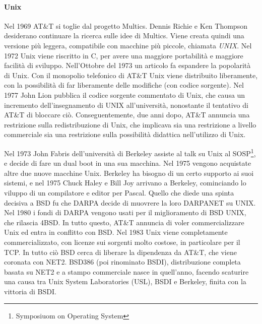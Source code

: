 \paragraph*{Unix} Nel 1969 AT\&T si toglie dal progetto Multics. Dennis Richie e Ken Thompson desiderano continuare la ricerca sulle idee di Multics. Viene creata quindi una versione pi\`u leggera, compatibile con macchine pi\`u piccole, chiamata \textit{UNIX}. Nel 1972 Unix viene riscritto in C, per avere una maggiore portabilit\`a e maggiore facilit\`a di sviluppo. Nell'Ottobre del 1973 un articolo fa espandere la popolarit\`a di Unix.
Con il monopolio telefonico di AT\&T Unix viene distribuito liberamente, con la possibilit\`a di far liberamente delle modifiche (con codice sorgente). Nel 1977 John Lion pubblica il codice sorgente commentato di Unix, che causa un incremento dell'insegnamento di UNIX all'universit\`a, nonostante il tentativo di AT\&T di bloccare ci\`o. Conseguentemente, due anni dopo, AT\&T annuncia una restrizione sulla redistribuzione di Unix, che implicava sia una restrizione a livello commerciale sia una restrizione sulla possibilit\`a didattica nell'utilizzo di Unix.

Nel 1973 John Fabris dell'universit\`a di Berkeley assiste al talk su Unix al SOSP\footnote{Symposiuom on Operating System}, e decide di fare un dual boot in una sua macchina. Nel 1975 vengono acquistate altre due nuove macchine Unix. Berkeley ha bisogno di un certo supporto ai suoi sistemi, e nel 1975 Chuck Haley e Bill Joy arrivano a Berkeley, cominciando lo viluppo di un compilatore e editor per Pascal. Quello che diede una spinta decisiva a BSD fu che DARPA decide di muovrere la loro DARPANET su UNIX. Nel 1980 i fondi di DARPA vengono usati per il miglioramento di BSD UNIX, che rilascia 4BSD. In tutto questo, AT\&T annuncia di voler commercializzare Unix ed entra in conflitto con BSD. Nel 1983 Unix viene completamente commercializzato, con licenze sui sorgenti molto costose, in particolare per il TCP. In tutto ci\`o BSD cerca di liberare la dipendenza da AT\&T, che viene coronata con NET2. BSD386 (poi rinominato BSDI), distribuzione completa basata su NET2 e a stampo commerciale nasce in quell'anno, facendo scaturire una causa tra Unix System Laboratories (USL), BSDI e Berkeley, finita con la vittoria di BSDI.
